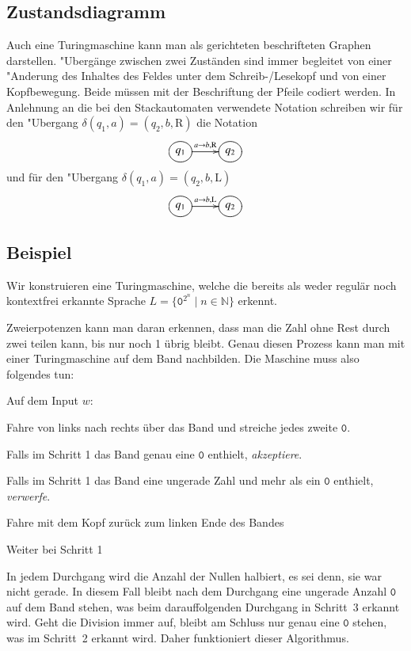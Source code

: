 \subsection{Zustandsdiagramm}
Auch eine Turingmaschine kann man als gerichteten beschrifteten Graphen
darstellen. "Ubergänge zwischen zwei Zuständen sind immer begleitet von
einer "Anderung des Inhaltes des Feldes unter dem Schreib-/Lesekopf
und von einer Kopfbewegung. Beide müssen mit der Beschriftung
der Pfeile codiert werden. In Anlehnung an die bei den Stackautomaten
verwendete Notation schreiben wir für den "Ubergang
$\delta(q_1,a)=(q_2,b,\text{R})$
die Notation
\[
\entrymodifiers={++[o][F]}
\xymatrix{
{q_1}\ar[r]^{a\to b,\text{R}}
	&{q_2}
}
\]
und für den "Ubergang
$\delta(q_1,a)=(q_2,b,\text{L})$
\[
\entrymodifiers={++[o][F]}
\xymatrix{
{q_1}\ar[r]^{a\to b,\text{L}}
	&{q_2}
}
\]

\subsection{Beispiel}
Wir konstruieren eine Turingmaschine, welche die bereits als weder regulär
noch kontextfrei erkannte Sprache $L=\{\texttt{0}^{2^n}\;|\; n\in\mathbb N\}$
erkennt.

Zweierpotenzen kann man daran erkennen, dass man die Zahl ohne
Rest durch zwei teilen kann, bis nur noch 1 übrig bleibt. Genau
diesen Prozess kann man mit einer Turingmaschine auf dem Band
nachbilden. Die Maschine muss also folgendes tun:

Auf dem Input $w$:
\begin{compactenum}
\item Fahre von links nach rechts über das Band und streiche jedes zweite $\texttt{0}$.
\item Falls im Schritt 1 das Band genau eine $\texttt{0}$ enthielt, {\it akzeptiere}.
\item Falls im Schritt 1 das Band eine ungerade Zahl und mehr als ein $\texttt{0}$
enthielt, {\it verwerfe}.
\item Fahre mit dem Kopf zurück zum linken Ende des Bandes
\item Weiter bei Schritt 1
\end{compactenum}
In jedem Durchgang wird die Anzahl der Nullen halbiert, es sei denn,
sie war nicht gerade. In diesem Fall bleibt nach dem Durchgang eine
ungerade Anzahl $\texttt{0}$ auf dem Band stehen, was beim darauffolgenden Durchgang
in Schritt~3 erkannt wird. Geht die Division immer auf, bleibt am Schluss
nur genau eine $\texttt{0}$ stehen, was im Schritt~2 erkannt wird. Daher funktioniert
dieser Algorithmus.

